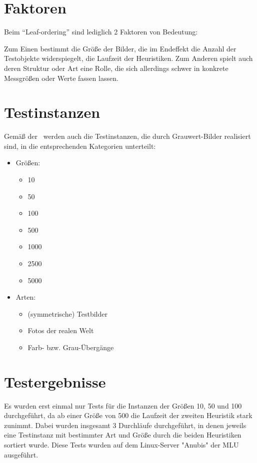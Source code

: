 \documentclass[a4paper, 10pt, twoside, onecolumn, parskip]{scrartcl}
\begin{document}
    \section{Faktoren} \label{sec:faktoren}

    Beim \enquote{Leaf-ordering} sind lediglich 2 Faktoren von Bedeutung:

    Zum Einen bestimmt die Größe der Bilder, die im Endeffekt die Anzahl der Testobjekte widerspiegelt, die Laufzeit der Heuristiken.
    Zum Anderen spielt auch deren Struktur oder Art eine Rolle, die sich allerdings schwer in konkrete Messgrößen oder Werte fassen lassen.

    \section{Testinstanzen} \label{sec:testinstanzen}

    Gemäß der~ werden auch die Testinstanzen, die durch Grauwert-Bilder realisiert sind, in die entsprechenden Kategorien unterteilt:

    \begin{itemize}
        \item Größen:
        \begin{itemize}
            \item 10
            \item 50
            \item 100
            \item 500
            \item 1000
            \item 2500
            \item 5000
        \end{itemize}
        \item Arten:
        \begin{itemize}
            \item (symmetrische) Testbilder
            \item Fotos der realen Welt
            \item Farb- bzw. Grau-Übergänge
        \end{itemize}
    \end{itemize}

    \section{Testergebnisse}

    Es wurden erst einmal nur Tests für die Instanzen der Größen 10, 50 und 100 durchgeführt, da ab einer Größe von 500 die Laufzeit der zweiten Heuristik stark zunimmt.
    Dabei wurden insgesamt 3 Durchläufe durchgeführt, in denen jeweils eine Testinstanz mit bestimmter Art und Größe durch die beiden Heuristiken sortiert wurde.
    Diese Tests wurden auf dem Linux-Server "Anubis" der MLU ausgeführt.
\end{document}
